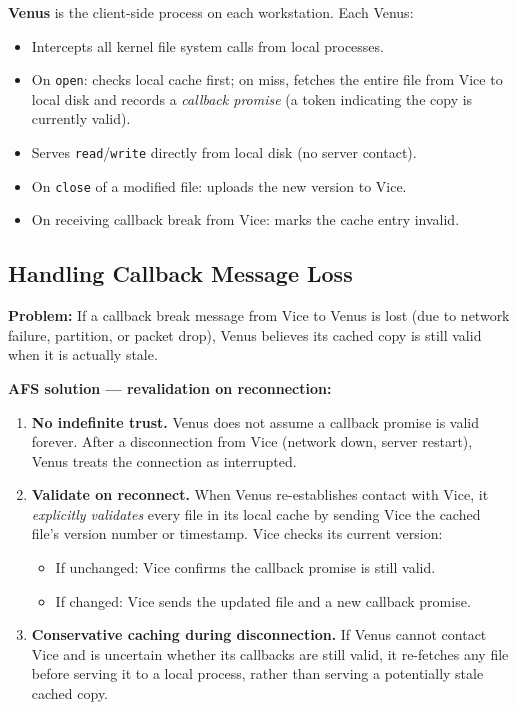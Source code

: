 \documentclass[12pt,a4paper]{article}
\begin{document}
\textbf{Venus} is the client-side process on each workstation. Each Venus:
\begin{itemize}[noitemsep]
  \item Intercepts all kernel file system calls from local processes.
  \item On \texttt{open}: checks local cache first; on miss, fetches the entire file from Vice to local disk and records a \emph{callback promise} (a token indicating the copy is currently valid).
  \item Serves \texttt{read}/\texttt{write} directly from local disk (no server contact).
  \item On \texttt{close} of a modified file: uploads the new version to Vice.
  \item On receiving callback break from Vice: marks the cache entry invalid.
\end{itemize}

\subsection*{Handling Callback Message Loss}

\textbf{Problem:} If a callback break message from Vice to Venus is lost (due to network failure, partition, or packet drop), Venus believes its cached copy is still valid when it is actually stale.

\textbf{AFS solution --- revalidation on reconnection:}
\begin{enumerate}
  \item \textbf{No indefinite trust.} Venus does not assume a callback promise is valid forever. After a disconnection from Vice (network down, server restart), Venus treats the connection as interrupted.
  \item \textbf{Validate on reconnect.} When Venus re-establishes contact with Vice, it \emph{explicitly validates} every file in its local cache by sending Vice the cached file's version number or timestamp. Vice checks its current version:
    \begin{itemize}[noitemsep]
      \item If unchanged: Vice confirms the callback promise is still valid.
      \item If changed: Vice sends the updated file and a new callback promise.
    \end{itemize}
  \item \textbf{Conservative caching during disconnection.} If Venus cannot contact Vice and is uncertain whether its callbacks are still valid, it re-fetches any file before serving it to a local process, rather than serving a potentially stale cached copy.
\end{enumerate}
\end{document}

